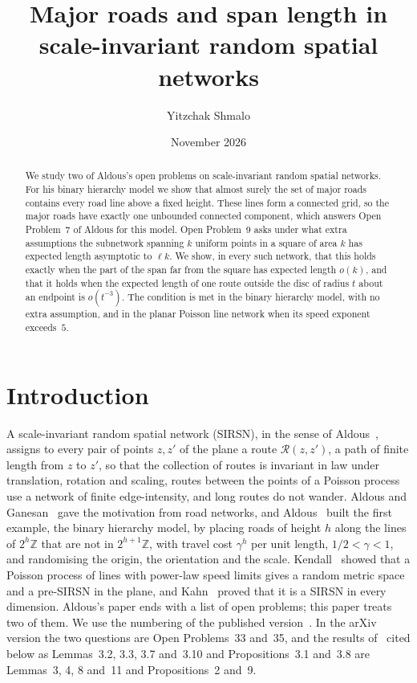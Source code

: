 \documentclass[11pt]{amsart}
\title[Major roads in a scale-invariant random spatial network]{Major roads and span length in scale-invariant
random spatial networks}
\author{Yitzchak Shmalo}
\date{November 2026}
\theoremstyle{remark}
\newcommand{\Z}{\mathbb{Z}}
\begin{document}
\begin{abstract}
We study two of Aldous's open problems on scale-invariant random spatial networks. For his binary hierarchy model we
show that almost surely the set of major roads contains every road line above a fixed height. These lines form a
connected grid, so the major roads have exactly one unbounded connected component, which answers Open Problem~7 of
Aldous for this model. Open Problem~9 asks under what extra assumptions the subnetwork spanning $k$ uniform points in a
square of area $k$ has expected length asymptotic to $\ell k$. We show, in every such network, that this holds exactly
when the part of the span far from the square has expected length $o(k)$, and that it holds when the expected length
of one route outside the disc of radius $t$ about an endpoint is $o(t^{-3})$. The condition is met in the binary
hierarchy model, with no extra assumption, and in the planar Poisson line network when its speed exponent exceeds~$5$.
\end{abstract}
\maketitle

\section{Introduction}

A scale-invariant random spatial network (SIRSN), in the sense of Aldous~\cite{A14}, assigns to every pair of points
$z,z'$ of the plane a route $\mathcal R(z,z')$, a path of finite length from $z$ to $z'$, so that the collection of
routes is invariant in law under translation, rotation and scaling, routes between the points of a Poisson process
use a network of finite edge-intensity, and long routes do not wander. Aldous and Ganesan~\cite{AG13} gave the
motivation from road networks, and Aldous~\cite{A14} built the first example, the binary hierarchy model, by placing
roads of height $h$ along the lines of $2^h\Z$ that are not in $2^{h+1}\Z$, with travel cost $\gamma^{h}$ per unit
length, $1/2<\gamma<1$, and randomising the origin, the orientation and the scale. Kendall~\cite{K17} showed that a
Poisson process of lines with power-law speed limits gives a random metric space and a pre-SIRSN in the plane, and
Kahn~\cite{Kahn16} proved that it is a SIRSN in every dimension. Aldous's paper ends with a list of open problems; this
paper treats two of them. We use the numbering of the published version~\cite{A14}. In the arXiv version the two
questions are Open Problems~33 and~35, and the results of~\cite{A14} cited below as Lemmas~3.2, 3.3, 3.7 and~3.10 and
Propositions~3.1 and~3.8 are Lemmas~3, 4, 8 and~11 and Propositions~2 and~9.
\end{document}
